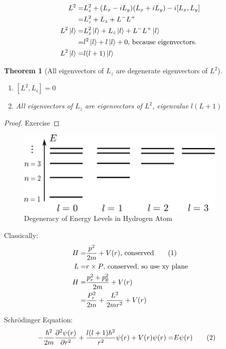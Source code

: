 \documentclass[]{article}
\newcommand\numberthis{\addtocounter{equation}{1}\tag{\theequation}}
\newtheorem{thm}{Theorem}
\begin{document}
\begin{align*}
L^2 =& L_z^2 +(L_x-iL_y)(L_x+iL_y) -i [L_x,L_y]\\
=& L_z^2 + L_z + L^-L^+\\
L^2\ket{l}=& L_z^2\ket{l} + L_z\ket{l} + L^-L^+\ket{l}\\
=& l^2\ket{l} + l\ket{l} + 0\text{, because eigenvectors.}\\
L^2\ket{l}=&l (l+1) \ket{l}
\end{align*}

\begin{thm}[All eigenvectors of $L_z$ are degenerate eigenvectors of $L^2$]
	\begin{enumerate}
		\item $[L^2, L_i] =0$
		\item All eigenvectors of $L_z$ are eigenvectors of $L^2$, eigenvalue $l(L+1)$
	\end{enumerate}
\end{thm}
\begin{proof}
	Exercise
\end{proof}

\begin{figure}[H]
	\caption{Degeneracy of Energy Levels in Hydrogen Atom}\label{fig:degeneracy:hydrogen}
	\includegraphics[width=0.9\textwidth]{hydrogen-degeneracy}
\end{figure}
Classically:
\begin{align*}
H =& \frac{p^2}{2m} + V(r) \text{, conserved} \numberthis \label{eq:classical:Hamiltonian}\\
L =& r \times P  \text{, conserved, so use xy plane}\\
H =& \frac{p_r^2+p_{\theta}^2}{2m} +V(r)\\
=& \frac{P_r^2}{2m} + \frac{L^2}{2m r^2} + V(r) 
\end{align*}

Schr\"odinger Equation:
\begin{align*}
-\frac{\hslash^2}{2m}\frac{\partial^2 \psi(r)}{\partial r^2} + \frac{l(l+1)\hslash^2}{r^2}\psi(r)+V(r)\psi(r) =& E\psi(r)\numberthis \label{eq:schroedinger:central}
\end{align*}
\end{document}
